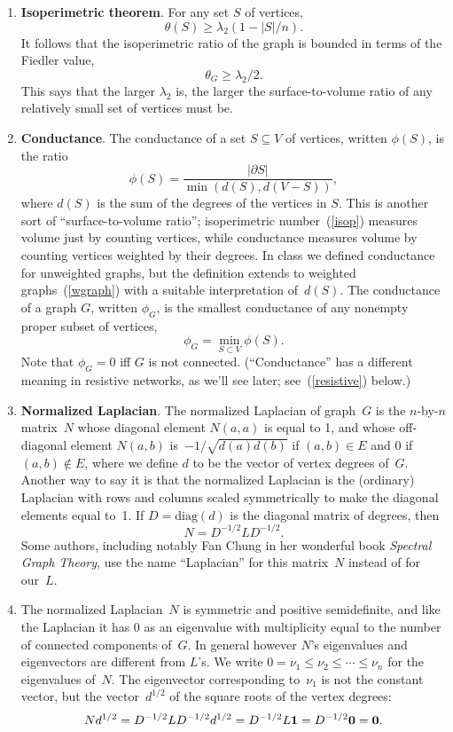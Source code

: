 \documentclass[11pt]{article}
\newcommand{\m}[1]{{\bf{#1}}}       %
\newcommand{\ones}{\m1}             %
\newcommand{\zeros}{\m0}            %
\newcommand{\diag}{\mbox{diag}}
\begin{document}
\begin{enumerate}
\item\label{isopthm} {\bf Isoperimetric theorem}.
For any set $S$ of vertices, 
$$\theta(S) \geq \lambda_2(1-|S|/n).$$
It follows that the isoperimetric ratio of the graph is bounded 
in terms of the Fiedler value,
$$\theta_G \geq \lambda_2/2.$$
This says that the larger $\lambda_2$ is, the larger the surface-to-volume
ratio of any relatively small set of vertices must be.

\item\label{cond}{\bf Conductance}.
The conductance of a set $S\subseteq V$ of vertices,
written $\phi(S)$, is the ratio 
$$\phi(S) = \frac{|\partial S|}{\min(d(S),d(V-S))},$$
where $d(S)$ is the sum of the degrees of the vertices in $S$.
This is another sort of ``surface-to-volume ratio'';
isoperimetric number~(\ref{isop}) measures volume just by counting vertices, 
while conductance measures volume by counting vertices weighted by their degrees.
In class we defined conductance for unweighted graphs,
but the definition extends to weighted graphs~(\ref{wgraph}) with
a suitable interpretation of~$d(S)$.
The conductance of a graph $G$,
written $\phi_G$, is the smallest conductance of any nonempty 
proper subset of vertices,
$$\phi_G = \min_{S\subset V}\phi(S).$$
Note that $\phi_G=0$ iff $G$ is not connected.
(``Conductance'' has a different meaning in resistive networks, 
as we'll see later; see~(\ref{resistive}) below.)

\item\label{nlap}{\bf Normalized Laplacian}.
The normalized Laplacian of graph~$G$ is 
the $n$-by-$n$ matrix~$N$
whose diagonal element $N(a,a)$ is equal to 1,
and whose off-diagonal element $N(a,b)$ 
is~$-1/\sqrt{d(a)d(b)}$ if $(a,b) \in E$ and $0$ if $(a,b) \notin E$,
where we define $d$ to be the vector of vertex degrees of~$G$.
Another way to say it is that the normalized Laplacian is 
the (ordinary) Laplacian with rows and columns scaled symmetrically 
to make the diagonal elements equal to~1. 
If $D=\diag(d)$ is the diagonal matrix of degrees, 
then 
$$N = D^{-1/2}LD^{-1/2}.$$
Some authors, including notably Fan Chung in her 
wonderful book {\em Spectral Graph Theory}, 
use the name ``Laplacian'' for this matrix~$N$
instead of for our~$L$.

\item\label{nlapeig}
The normalized Laplacian~$N$ is symmetric and 
positive semidefinite, and like the Laplacian
it has 0 as an eigenvalue with multiplicity
equal to the number of connected components
of~$G$.  In general however $N$'s eigenvalues
and eigenvectors are different from $L$'s.
We write $0=\nu_1\leq \nu_2\leq \cdots\leq \nu_n$
for the eigenvalues of~$N$.
The eigenvector corresponding to~$\nu_1$ is
not the constant vector, but the vector~$d^{1/2}$
of the square roots of the vertex degrees:
$$Nd^{1/2} = D^{-1/2}LD^{-1/2}d^{1/2} = D^{-1/2}L\ones = D^{-1/2}\zeros = \zeros.$$


\end{enumerate}
\end{document}
